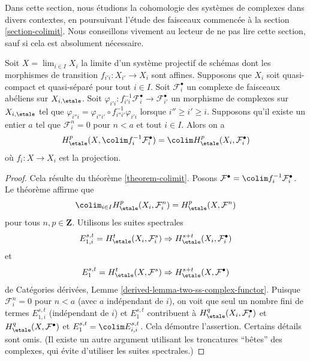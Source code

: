\noindent
Dans cette section, nous \'etudions la cohomologie des syst\`emes de complexes
dans divers contextes, en poursuivant l'\'etude des faisceaux commenc\'ee
\`a la section \ref{section-colimit}.
Nous conseillons vivement au lecteur de ne pas lire cette section, sauf si cela est absolument
n\'ecessaire.

\begin{lemma}
\label{lemma-colimit-variant-complexes}
Soit $X = \lim_{i \in I} X_i$ la limite d'un syst\`eme projectif de sch\'emas
dont les morphismes de transition $f_{i'i} : X_{i'} \to X_i$ sont affines. Supposons
que $X_i$ soit quasi-compact et quasi-s\'epar\'e pour tout $i \in I$.
Soit $\mathcal{F}_i^\bullet$ un complexe de faisceaux ab\'eliens sur
$X_{i, \etale}$. Soit $\varphi_{i'i} : f_{i'i}^{-1}\mathcal{F}_i^\bullet \to
\mathcal{F}_{i'}^\bullet$ un morphisme de complexes sur $X_{i, \etale}$
tel que $\varphi_{i''i} = \varphi_{i''i'} \circ f_{i'' i'}^{-1}\varphi_{i'i}$
lorsque $i'' \geq i' \geq i$. Supposons qu'il existe un entier $a$ tel que
$\mathcal{F}_i^n = 0$ pour $n < a$ et tout $i \in I$.
Alors on a
$$
H^p_\etale(X, \colim f_i^{-1}\mathcal{F}_i^\bullet) =
\colim H^p_\etale(X_i, \mathcal{F}^\bullet_i)
$$
o\`u $f_i : X \to X_i$ est la projection.
\end{lemma}

\begin{proof}
Cela r\'esulte du th\'eor\`eme \ref{theorem-colimit}. Posons
$\mathcal{F}^\bullet = \colim f_i^{-1}\mathcal{F}_i^\bullet$.
Le th\'eor\`eme affirme que
$$
\colim_{i \in I} H_\etale^p(X_i, \mathcal{F}_i^n) =
H_\etale^p(X, \mathcal{F}^n)
$$
pour tous $n, p \in \mathbf{Z}$. Utilisons les suites spectrales
$$
E_{1, i}^{s, t} = H_\etale^t(X_i, \mathcal{F}_i^s) \Rightarrow
H_\etale^{s + t}(X_i, \mathcal{F}_i^\bullet)
$$
et
$$
E_1^{s, t} = H_\etale^t(X, \mathcal{F}^s) \Rightarrow
H_\etale^{s + t}(X, \mathcal{F}^\bullet)
$$
de Cat\'egories d\'eriv\'ees, Lemme \ref{derived-lemma-two-ss-complex-functor}.
Puisque $\mathcal{F}_i^n = 0$ pour $n < a$ (avec $a$ ind\'ependant de $i$),
on voit que seul un nombre fini de termes $E_{1, i}^{s, t}$
(ind\'ependant de $i$) et $E_1^{s, t}$ contribuent \`a
$H^q_\etale(X_i, \mathcal{F}_i^\bullet)$ et
$H^q_\etale(X, \mathcal{F}^\bullet)$ et $E_1^{s, t} = \colim E_{i, i}^{s, t}$.
Cela d\'emontre l'assertion. Certains d\'etails sont omis.
(Il existe un autre argument utilisant les troncatures ``b\^etes''
des complexes, qui \'evite d'utiliser les suites spectrales.)
\end{proof}

